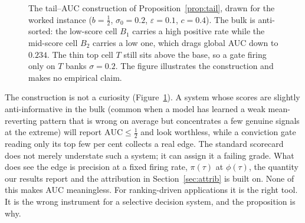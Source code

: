 \documentclass{sbc2023}%
\theoremstyle{definition}
\theoremstyle{plain}
\begin{document}
\begin{figure}[t]
\centering
{}
\caption{The tail--AUC construction of Proposition~\ref{prop:tail}, drawn for the
worked instance ($b=\tfrac12$, $\sigma_0=0.2$, $\varepsilon=0.1$, $c=0.4$). The bulk is
anti-sorted: the low-score cell $B_1$ carries a high positive rate while the mid-score
cell $B_2$ carries a low one, which drags global AUC down to $0.234$. The thin top cell
$T$ still sits above the base, so a gate firing only on $T$ banks $\sigma=0.2$. The
figure illustrates the construction and makes no empirical claim.}
\label{fig:construction}
\end{figure}

The construction is not a curiosity (Figure~\ref{fig:construction}). A system whose scores are slightly
anti-informative in the bulk (common when a model has learned a weak mean-reverting
pattern that is wrong on average but concentrates a few genuine signals at the
extreme) will report $\mathrm{AUC}\le\tfrac12$ and look worthless, while a conviction
gate reading only its top few per cent collects a real edge. The standard scorecard
does not merely understate such a system; it can assign it a failing grade. What does
see the edge is precision at a fixed firing rate, $\pi(\tau)$ at $\phi(\tau)$, the
quantity our results report and the attribution in Section~\ref{sec:attrib} is built
on. None of this makes AUC meaningless. For ranking-driven applications it is the
right tool. It is the wrong instrument for a selective decision system, and the
proposition is why.
\end{document}
